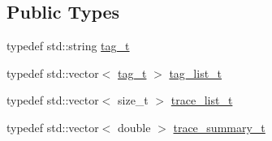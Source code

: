 \subsection*{Public Types}
\begin{DoxyCompactItemize}
\item 
typedef std\+::string \hyperlink{class_wire_cell_1_1_i_frame_ae206ba618e10f398625dfeb675a4215a}{tag\+\_\+t}
\item 
typedef std\+::vector$<$ \hyperlink{class_wire_cell_1_1_i_frame_ae206ba618e10f398625dfeb675a4215a}{tag\+\_\+t} $>$ \hyperlink{class_wire_cell_1_1_i_frame_ab34485d40e352997c21b9ec99504ba7c}{tag\+\_\+list\+\_\+t}
\item 
typedef std\+::vector$<$ size\+\_\+t $>$ \hyperlink{class_wire_cell_1_1_i_frame_a12f08adf79d21cb9b4862a16193fda8f}{trace\+\_\+list\+\_\+t}
\item 
typedef std\+::vector$<$ double $>$ \hyperlink{class_wire_cell_1_1_i_frame_ad65f8b090c2607591e44d7b40777517e}{trace\+\_\+summary\+\_\+t}
\end{DoxyCompactItemize}

